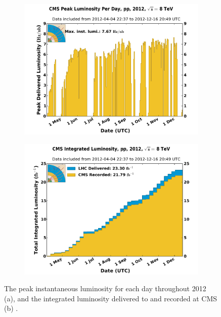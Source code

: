 \begin{figure}[t]
  \centering
  \begin{subfigure}[b]{0.46\textwidth}
    \includegraphics[width=\textwidth]{Figs/machine/peak_lumi_per_day_pp_2012.pdf}
    \caption{}
    \label{fig:inst_lumi_day}
  \end{subfigure}
  \begin{subfigure}[b]{0.46\textwidth}
    \includegraphics[width=\textwidth]{Figs/machine/int_lumi_per_week_cumulative_pp_2012.pdf}
    \caption{}
    \label{fig:int_lumi_week_cumu}
  \end{subfigure}
  \caption{The peak instantaneous luminosity for each day throughout 2012 
  (a), and the integrated luminosity delivered to and recorded at CMS (b) 
  \cite{cmslumi}.}
  \label{fig:lumi_2012}
\end{figure}


